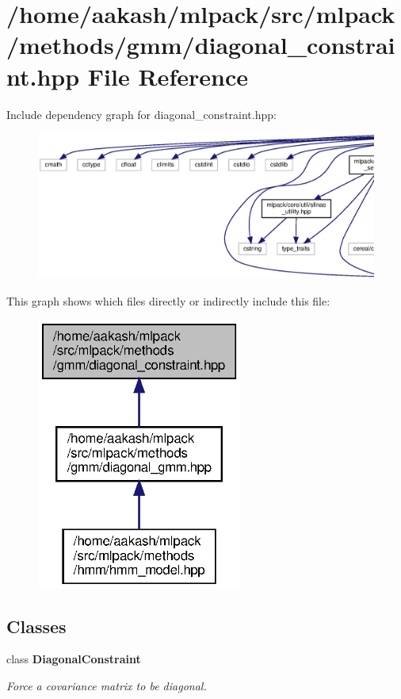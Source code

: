 \section{/home/aakash/mlpack/src/mlpack/methods/gmm/diagonal\+\_\+constraint.hpp File Reference}
\label{diagonal__constraint_8hpp}
Include dependency graph for diagonal\+\_\+constraint.\+hpp\+:
\nopagebreak
\begin{figure}[H]
\begin{center}
\leavevmode
\includegraphics[width=350pt]{diagonal__constraint_8hpp__incl}
\end{center}
\end{figure}
This graph shows which files directly or indirectly include this file\+:
\nopagebreak
\begin{figure}[H]
\begin{center}
\leavevmode
\includegraphics[width=191pt]{diagonal__constraint_8hpp__dep__incl}
\end{center}
\end{figure}
\subsection*{Classes}
\begin{DoxyCompactItemize}
\item 
class \textbf{ Diagonal\+Constraint}
\begin{DoxyCompactList}\small\item\em Force a covariance matrix to be diagonal. \end{DoxyCompactList}\end{DoxyCompactItemize}
